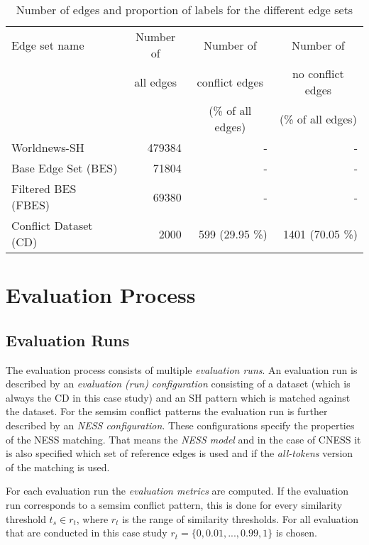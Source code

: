 \documentclass[11pt]{scrreprt}
\begin{document}
\begin{table}
\centering
\begin{tabular}{lrrr}
\toprule
\multicolumn{1}{l}{Edge set name}	& \multicolumn{1}{c}{Number of} 		& \multicolumn{1}{c}{Number of} 		& \multicolumn{1}{c}{Number of} \\
\multicolumn{1}{l}{} 				& \multicolumn{1}{c}{all edges} 		& \multicolumn{1}{c}{conflict edges} 	& \multicolumn{1}{c}{no conflict edges} \\
\multicolumn{1}{l}{} 				& \multicolumn{1}{c}{} 				& \multicolumn{1}{c}{(\% of all edges)} & \multicolumn{1}{c}{(\% of all edges)} \\
\midrule
Worldnews-SH						& 479384		& -					& - \\
Base Edge Set (BES)					& 71804		& -					& - \\
Filtered BES (FBES)					& 69380 		& - 					& - \\
Conflict Dataset (CD)				& 2000 		& 599 (29.95 \%) 	& 1401 (70.05 \%) \\
\bottomrule
\end{tabular}
\caption{Number of edges and proportion of labels for the different edge sets}
\label{tab:dataset-descriptions}
\end{table}


\section{Evaluation Process}


\subsection{Evaluation Runs}
The evaluation process consists of multiple \textit{evaluation runs}. An evaluation run is described by an \textit{evaluation (run) configuration} consisting of a dataset (which is always the CD in this case study) and an SH pattern which is matched against the dataset. For the semsim conflict patterns the evaluation run is further described by an \textit{NESS configuration}. These configurations specify the properties of the NESS matching. That means the \textit{NESS model} and in the case of CNESS it is also specified which set of reference edges is used and if the \textit{all-tokens} version of the matching is used. 

For each evaluation run the \textit{evaluation metrics} are computed. If the evaluation run corresponds to a semsim conflict pattern, this is done for every similarity threshold \(t_s \in r_t\), where \(r_t\) is the range of similarity thresholds. For all evaluation that are conducted in this case study \( r_t= \{0, 0.01, ...,  0.99, 1\}\) is chosen.
\end{document}
